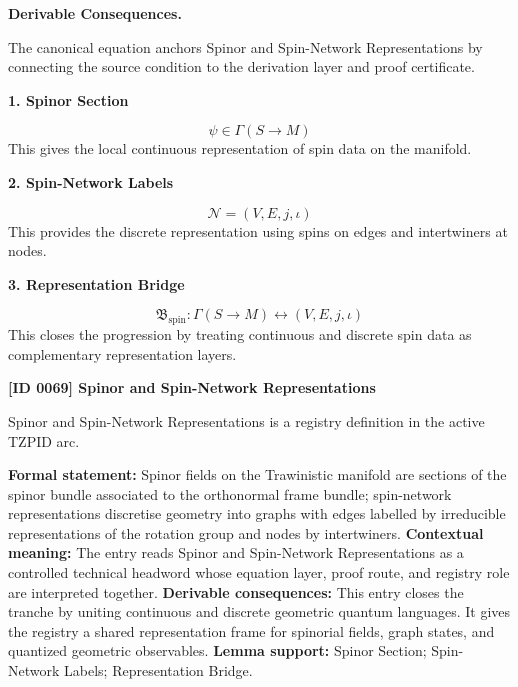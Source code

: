 \par\vspace{0.35em}
\noindent\textbf{Derivable Consequences.}\quad
\begingroup
\footnotesize
\raggedright
The canonical equation anchors Spinor and Spin-Network Representations by connecting the source condition to the derivation layer and proof certificate.
\par\endgroup

\noindent\textbf{1. Spinor Section}\par
\[
\psi \in \Gamma(S \to M)
\]
\noindent This gives the local continuous representation of spin data on the manifold.\par
\noindent\textbf{2. Spin-Network Labels}\par
\[
\mathcal{N} = (V,E,j,\iota)
\]
\noindent This provides the discrete representation using spins on edges and intertwiners at nodes.\par
\noindent\textbf{3. Representation Bridge}\par
\[
\mathfrak{B}_{\mathrm{spin}}:
\Gamma(S \to M)
\leftrightarrow
(V,E,j,\iota)
\]
\noindent This closes the progression by treating continuous and discrete spin data as complementary representation layers.\par

\clearpage
\noindent\textbf{[ID 0069] Spinor and Spin-Network Representations}\par
\vspace{0.35em}
\begingroup\small
{}
Spinor and Spin-Network Representations is a registry definition in the active TZPID arc.

\begingroup\footnotesize\setlength{\emergencystretch}{3em}\sloppy
\textbf{Formal statement:} Spinor fields on the Trawinistic manifold are sections of the spinor bundle associated to the orthonormal frame bundle; spin-network representations discretise geometry into graphs with edges labelled by irreducible representations of the rotation group and nodes by intertwiners. \textbf{Contextual meaning:} The entry reads Spinor and Spin-Network Representations as a controlled technical headword whose equation layer, proof route, and registry role are interpreted together. \textbf{Derivable consequences:} This entry closes the tranche by uniting continuous and discrete geometric quantum languages. It gives the registry a shared representation frame for spinorial fields, graph states, and quantized geometric observables. \textbf{Lemma support:} Spinor Section; Spin-Network Labels; Representation Bridge.\par
\endgroup

